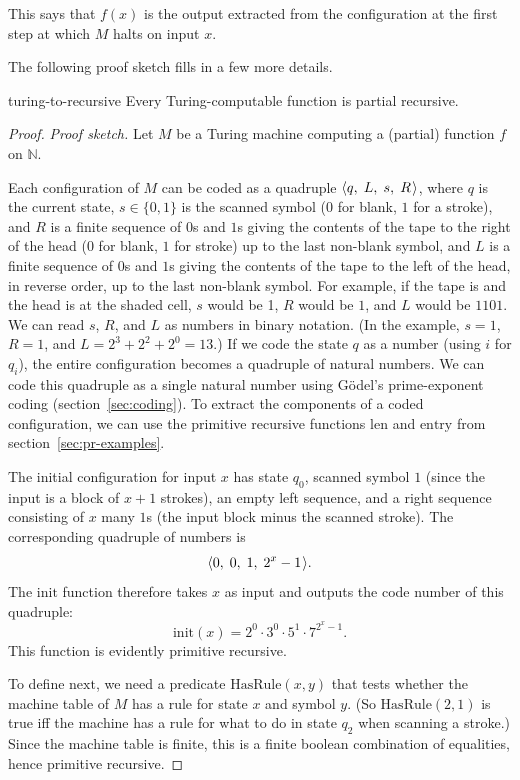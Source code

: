 \noindent%
This says that $f(x)$ is the output extracted from the configuration
at the first step at which $M$ halts on input $x$.

The following proof sketch fills in a few more details.

\begin{theorem}{}{turing-to-recursive}
  Every Turing-computable function is partial recursive.
\end{theorem}

\begin{proof}
  \emph{Proof sketch.}
  Let $M$ be a Turing machine computing a (partial) function $f$ on $\mathbb{N}$.

  Each configuration of $M$ can be coded as a quadruple $\t{q,\;L,\;s,\;R}$,
  where $q$ is the current state,
  $s\in\{0,1\}$ is the scanned symbol ($0$ for blank, $1$ for a stroke),
  and $R$ is a finite sequence of $0$s and $1$s
  giving the contents of the tape to the right of the head
  ($0$ for blank, $1$ for stroke)
  up to the last non-blank symbol,
  and $L$ is a finite sequence of $0$s and $1$s
  giving the contents of the tape to the left of the head,
  in reverse order,
  up to the last non-blank symbol.
  For example, if the tape is 
  and the head is at the shaded cell,
  $s$ would be 1,
  $R$ would be $1$,
  and $L$ would be $1101$.
  We can read $s$, $R$, and $L$ as numbers in binary notation.
  (In the example, $s=1$, $R=1$, and $L=2^3+2^2+2^0=13$.)
  If we code the state $q$ as a number
  (using $i$ for $q_i$),
  the entire configuration becomes a quadruple of natural numbers.
  We can code this quadruple as a single natural number
  using Gödel's prime-exponent coding
  (section~\ref{sec:coding}).
  To extract the components of a coded configuration,
  we can use the primitive recursive functions
  $\mathrm{len}$ and $\mathrm{entry}$
  from section~\ref{sec:pr-examples}.

  The initial configuration for input $x$ has
  state $q_0$,
  scanned symbol $1$ (since the input is a block of $x+1$ strokes),
  an empty left sequence,
  and a right sequence consisting of $x$ many $1$s (the input block minus the scanned stroke).
  The corresponding quadruple of numbers is
  \[
    \t{0,\;0,\;1,\;2^x-1}.
  \]
  The $\mathrm{init}$ function therefore takes $x$ as input and outputs the code number of this quadruple:
  \[
    \mathrm{init}(x) = 2^0 \cdot 3^0 \cdot 5^1 \cdot 7^{2^x-1}.
  \]
  This function is evidently primitive recursive.

  To define $\mathrm{next}$,
  we need a predicate $\mathrm{HasRule}(x,y)$
  that tests whether the machine table of $M$ has a rule
  for state $x$ and symbol $y$.
  (So $\mathrm{HasRule}(2,1)$ is true iff
  the machine has a rule for what to do in state $q_2$ when scanning a stroke.)
  Since the machine table is finite,
  this is a finite boolean combination of equalities,
  hence primitive recursive.


\end{proof}
